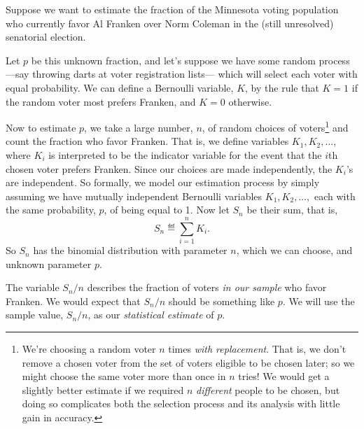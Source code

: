 \fi


Suppose we want to estimate the fraction of the Minnesota voting
population who currently favor Al Franken over Norm Coleman in the (still
unresolved) senatorial election.

\iffalse
\footnote{We can only keep our fingers crossed for this race to happen --
when they ran against each other for the U.S. Senate in 2000, they
generated some of the best entertainment in TV history.}  \fi

Let $p$ be this unknown fraction, and let's suppose we have some random
process ---say throwing darts at voter registration lists--- which will
select each voter with equal probability.  We can define a Bernoulli
variable, $K$, by the rule that $K=1$ if the random voter most prefers
Franken, and $K=0$ otherwise.

Now to estimate $p$, we take a large number, $n$, of random choices of
voters\footnote{We're choosing a random voter $n$ times \emph{with
replacement}.  That is, we don't remove a chosen voter from the set of
voters eligible to be chosen later; so we might choose the same voter more
than once in $n$ tries!  We would get a slightly better estimate if we
required $n$ \emph{different} people to be chosen, but doing so complicates
both the selection process and its analysis with little gain in accuracy.}
and count the fraction who favor Franken.  That is, we define variables $K_1,
K_2, \dots$, where $K_i$ is interpreted to be the indicator variable for
the event that the $i$th chosen voter prefers Franken.  Since our choices are
made independently, the $K_i$'s are independent.  So formally, we model our
estimation process by simply assuming we have mutually independent
Bernoulli variables $K_1, K_2, \dots,$ each with the same probability, $p$,
of being equal to 1.  Now let $S_n$ be their sum, that is,
\begin{equation}\label{LN12:Sn}
S_n \eqdef \sum_{i=1}^n K_i.
\end{equation}
So $S_n$ has the binomial distribution with parameter $n$, which we can
choose, and unknown parameter $p$.

The variable $S_n/n$ describes the fraction of voters \emph{in our sample}
who favor Franken.  We would expect that $S_n/n$ should
be something like $p$.
We will use the sample value, $S_n/n$, as our \emph{statistical estimate} of
$p$.

